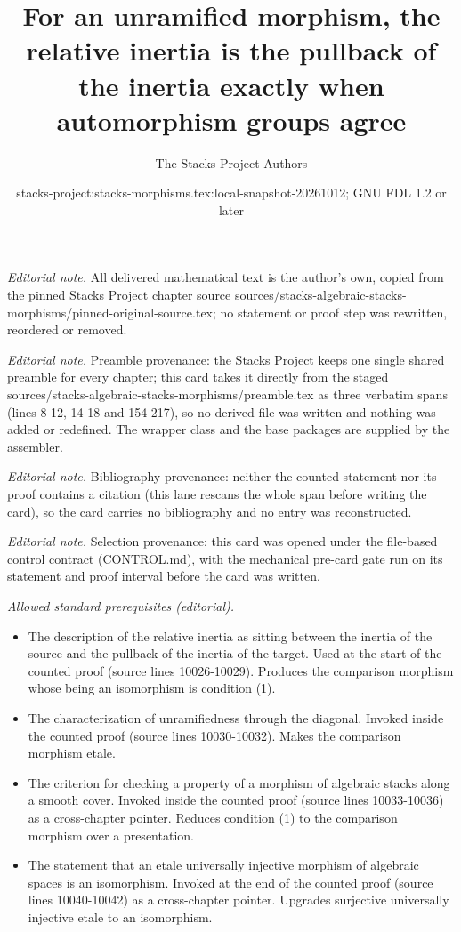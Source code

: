 \documentclass[10pt,a4paper]{amsart}
\title{For an unramified morphism, the relative inertia is the pullback of the inertia exactly when automorphism groups agree}
\author{The Stacks Project Authors}
\date{stacks-project:stacks-morphisms.tex:local-snapshot-20261012; GNU FDL 1.2 or later}
\theoremstyle{plain}
\theoremstyle{definition}
\theoremstyle{remark}
\numberwithin{equation}{subsection}
\begin{document}
\maketitle
\noindent\textit{Editorial note.} All delivered mathematical text is the author's own, copied from the pinned Stacks Project chapter source sources/stacks-algebraic-stacks-morphisms/pinned-original-source.tex; no statement or proof step was rewritten, reordered or removed.\par\medskip
\noindent\textit{Editorial note.} Preamble provenance: the Stacks Project keeps one single shared preamble for every chapter; this card takes it directly from the staged sources/stacks-algebraic-stacks-morphisms/preamble.tex as three verbatim spans (lines 8-12, 14-18 and 154-217), so no derived file was written and nothing was added or redefined. The wrapper class and the base packages are supplied by the assembler.\par\medskip
\noindent\textit{Editorial note.} Bibliography provenance: neither the counted statement nor its proof contains a citation (this lane rescans the whole span before writing the card), so the card carries no bibliography and no entry was reconstructed.\par\medskip
\noindent\textit{Editorial note.} Selection provenance: this card was opened under the file-based control contract (CONTROL.md), with the mechanical pre-card gate run on its statement and proof interval before the card was written.\par\medskip
\noindent\textit{Allowed standard prerequisites (editorial).}\begin{itemize}
\item The description of the relative inertia as sitting between the inertia of the source and the pullback of the inertia of the target. Used at the start of the counted proof (source lines 10026-10029). Produces the comparison morphism whose being an isomorphism is condition (1).
\item The characterization of unramifiedness through the diagonal. Invoked inside the counted proof (source lines 10030-10032). Makes the comparison morphism etale.
\item The criterion for checking a property of a morphism of algebraic stacks along a smooth cover. Invoked inside the counted proof (source lines 10033-10036) as a cross-chapter pointer. Reduces condition (1) to the comparison morphism over a presentation.
\item The statement that an etale universally injective morphism of algebraic spaces is an isomorphism. Invoked at the end of the counted proof (source lines 10040-10042) as a cross-chapter pointer. Upgrades surjective universally injective etale to an isomorphism.
\end{itemize}\medskip
\end{document}
